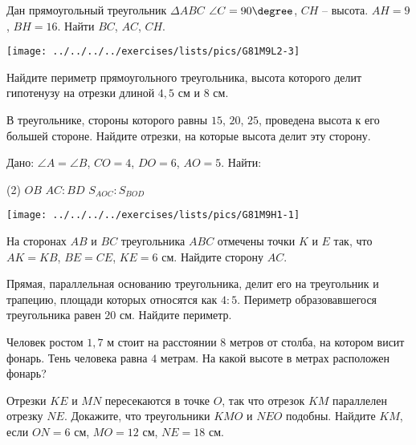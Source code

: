 \begin{class}[number=2]
\begin{listofex}
\begin{minipage}[t]{\bodywidth}
		 Дан прямоугольный треугольник  \( \Delta ABC\)  \( \angle C = 90\degree  \), \( CH \) – высота. \( AH=9 \), \( BH = 16 \). Найти \( BC \), \( AC \), \( CH \).
	\end{minipage}
	\hspace{0.02\linewidth}
	\begin{minipage}[t]{\picwidth}
		\texttt{[image: ../../../../exercises/lists/pics/G81M9L2-3]}
	\end{minipage}
	\item Найдите периметр прямоугольного треугольника, высота которого делит гипотенузу на отрезки длиной \( 4,5 \) см и \( 8 \) см.
	\item В треугольнике, стороны которого равны \( 15 \), \( 20 \), \( 25 \), проведена высота к его большей стороне. Найдите отрезки, на которые высота делит эту сторону.
	\end{listofex}
\end{class}

\begin{homework}[number=1]
	\begin{listofex}
		\item 
		\begin{minipage}[t]{\bodywidth}
			Дано: \( \angle A = \angle B \), \( CO = 4 \), \( DO = 6 \), \( AO = 5  \). Найти:\begin{tasks}(2)
			\task \( OB \)
			\task \( AC : BD \) 
			\task \( S_{AOC} : S_{BOD} \)
		\end{tasks}
		\end{minipage}
		\hspace{0.02\linewidth}
		\begin{minipage}[t]{\picwidth}
			\texttt{[image: ../../../../exercises/lists/pics/G81M9H1-1]}
		\end{minipage}
		\item На сторонах \( AB \) и \( BC \) треугольника \( ABC \) отмечены точки \( K \) и \( E \) так, что \( AK=KB \), \( BE=CE \), \( KE=6 \) см. Найдите сторону \( AC \).
		\item  Прямая, параллельная основанию треугольника, делит его на треугольник и трапецию, площади которых относятся как \( 4:5 \). Периметр образовавшегося треугольника равен \( 20 \) см. Найдите периметр.
		\item Человек ростом \( 1,7 \) м стоит на расстоянии \( 8 \) метров от столба, на котором висит фонарь. Тень человека равна \( 4 \) метрам. На какой высоте в метрах расположен фонарь?
		\item Отрезки \( KE \) и \( MN \) пересекаются в точке \( O \), так что отрезок \( KM \) параллелен отрезку \( NE \). Докажите, что треугольники \( KMO \) и \( NEO \) подобны. Найдите \( KM \), если \( ON=6 \) см, \( MO=12 \) см, \( NE=18 \) см.
	\end{listofex}
\end{homework}

